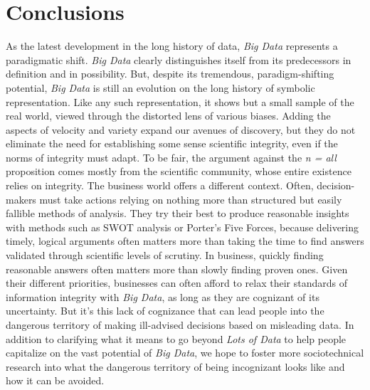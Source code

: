 \documentclass[sigconf]{acmart}
\begin{document}
\section{Conclusions}
As the latest development in the long history of data, {\em Big Data} represents a paradigmatic shift. {\em Big Data} clearly distinguishes itself from its predecessors in definition and in possibility. But, despite its tremendous, paradigm-shifting potential, {\em Big Data} is still an evolution on the long history of symbolic representation. Like any such representation, it shows but a small sample of the real world, viewed through the distorted lens of various biases. Adding the aspects of velocity and variety expand our avenues of discovery, but they do not eliminate the need for establishing some sense scientific integrity, even if the norms of integrity must adapt. To be fair, the argument against the {\em n = all} proposition comes mostly from the scientific community, whose entire existence relies on integrity. The business world offers a different context. Often, decision-makers must take actions relying on nothing more than structured but easily fallible methods of analysis.\cite{Keystone} They try their best to produce reasonable insights with methods such as SWOT analysis or Porter's Five Forces, because delivering timely, logical arguments often matters more than taking the time to find answers validated through scientific levels of scrutiny. In business, quickly finding reasonable answers often matters more than slowly finding proven ones. Given their different priorities, businesses can often afford to relax their standards of information integrity with {\em Big Data}, as long as they are cognizant of its uncertainty. But it's this lack of cognizance that can lead people into the dangerous territory of making ill-advised decisions based on misleading data. In addition to clarifying what it means to go beyond {\em Lots of Data} to help people capitalize on the vast potential of {\em Big Data}, we hope to foster more sociotechnical research into what the dangerous territory of being incognizant looks like and how it can be avoided.





 
\end{document}

